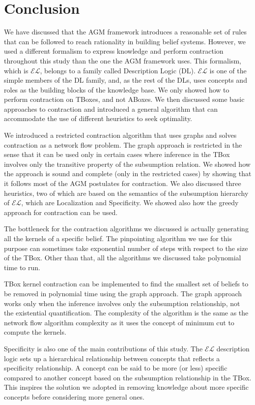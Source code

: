 \chapter{Conclusion}
We have discussed that the AGM framework introduces a reasonable set of rules that can be followed to reach rationality in building belief systems. However, we used a different formalism to express knowledge and perform contraction throughout this study than the one the AGM framework uses. This formalism, which is $\mathcal{EL}$, belongs to a family called Description Logic (DL). $\mathcal{EL}$ is one of the simple members of the DL family, and, as the rest of the DLs, uses concepts and roles as the building blocks of the knowledge base. We only showed how to perform contraction on TBoxes, and not ABoxes. We then discussed some basic approaches to contraction and introduced a general algorithm that can accommodate the use of different heuristics to seek optimality. 

We introduced a restricted contraction algorithm that uses graphs and solves contraction as a network flow problem. The graph approach is restricted in the sense that it can be used only in certain cases where inference in the TBox involves only the transitive property of the subsumption relation. We showed how the approach is sound and complete (only in the restricted cases) by showing that it follows most of the AGM postulates for contraction. We also discussed three heuristics, two of which are based on the semantics of the subsumption hierarchy of $\mathcal{EL}$, which are Localization and Specificity. We showed also how the greedy approach for contraction can be used.

The bottleneck for the contraction algorithms we discussed is actually generating all the kernels of a specific belief. The pinpointing algorithm we use for this purpose can sometimes take exponential number of steps with respect to the size of the TBox. Other than that, all the algorithms we discussed take polynomial time to run. 

TBox kernel contraction can be implemented to find the smallest set of beliefs to be removed in polynomial time using the graph approach. The graph approach works only when the inference involves only the subsumption relationship, not the existential quantification. The complexity of the algorithm is the same as the network flow algorithm complexity as it uses the concept of minimum cut to compute the kernels.

Specificity is also one of the main contributions of this study. The $\mathcal{EL}$ description logic sets up a hierarchical relationship between concepts that reflects a specificity relationship. A concept can be said to be more (or less) specific compared to another concept based on the subsumption relationship in the TBox. This inspires the solution we adopted in removing knowledge about more specific concepts before considering more general ones.

